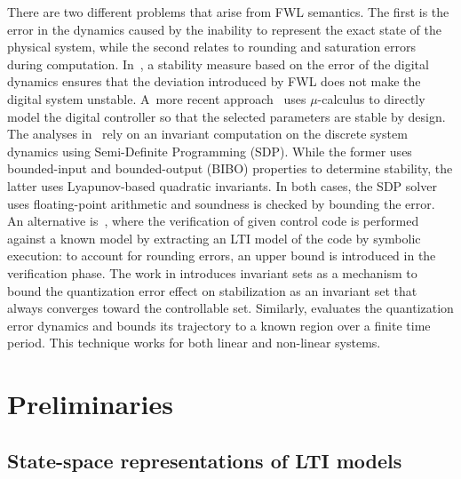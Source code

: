 \documentclass[sigconf]{llncs}
\newcommand{\mat}[1]{{#1}}
\renewcommand{\vec}[1]{{#1}}
\begin{document}
There are two different problems that arise from FWL semantics.  The first
is the error in the dynamics caused by the inability to represent the exact
state of the physical system, while the second relates to rounding and
saturation errors during computation.  In~\cite{fialho1994stability}, a
stability measure based on the error of the digital dynamics ensures that
the deviation introduced by FWL does not make the digital system unstable. 
A~more recent approach~\cite{DBLP:journals/automatica/WuLCC09} uses
$\mu$-calculus to directly model the digital controller so that the selected
parameters are stable by design.  The analyses
in~\cite{DBLP:conf/hybrid/RouxJG15,DBLP:conf/hybrid/WangGRJF16} rely on an
invariant computation on the discrete system dynamics using Semi-Definite
Programming (SDP).  While the former uses bounded-input and bounded-output
(BIBO) properties to determine stability, the latter uses Lyapunov-based
quadratic invariants.  In both cases, the SDP solver uses floating-point
arithmetic and soundness is checked by bounding the error.  An alternative
is~\cite{park2016scalable}, where the verification of given control code is
performed against a known model by extracting an LTI model of the code by
symbolic execution: to account for rounding errors, an upper bound is
introduced in the verification phase.  The work in
\cite{picasso2003stabilization} introduces invariant sets as a mechanism to
bound the quantization error effect on stabilization as an invariant set
that always converges toward the controllable set.  Similarly,
\cite{liberzon2003hybrid} evaluates the quantization error dynamics and
bounds its trajectory to a known region over a finite time period.  This
technique works for both linear and non-linear systems.

\section{Preliminaries}
\label{sec:preliminaries}

\subsection{State-space representations of LTI models}
\label{sec:model}

\end{document}
